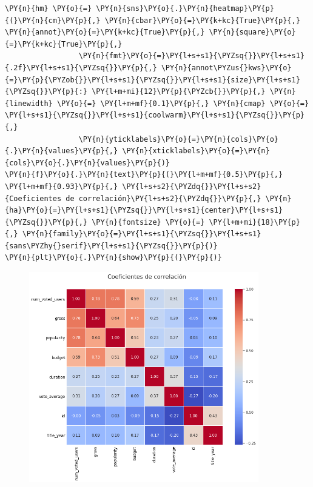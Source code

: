 \begin{tcolorbox}[breakable, size=fbox, boxrule=1pt, pad at break*=1mm,colback=cellbackground, colframe=cellborder]
\begin{Verbatim}[commandchars=\\\{\}]
\PY{n}{hm} \PY{o}{=} \PY{n}{sns}\PY{o}{.}\PY{n}{heatmap}\PY{p}{(}\PY{n}{cm}\PY{p}{,} \PY{n}{cbar}\PY{o}{=}\PY{k+kc}{True}\PY{p}{,} \PY{n}{annot}\PY{o}{=}\PY{k+kc}{True}\PY{p}{,} \PY{n}{square}\PY{o}{=}\PY{k+kc}{True}\PY{p}{,}
                 \PY{n}{fmt}\PY{o}{=}\PY{l+s+s1}{\PYZsq{}}\PY{l+s+s1}{.2f}\PY{l+s+s1}{\PYZsq{}}\PY{p}{,} \PY{n}{annot\PYZus{}kws}\PY{o}{=}\PY{p}{\PYZob{}}\PY{l+s+s1}{\PYZsq{}}\PY{l+s+s1}{size}\PY{l+s+s1}{\PYZsq{}}\PY{p}{:} \PY{l+m+mi}{12}\PY{p}{\PYZcb{}}\PY{p}{,} \PY{n}{linewidth} \PY{o}{=} \PY{l+m+mf}{0.1}\PY{p}{,} \PY{n}{cmap} \PY{o}{=} \PY{l+s+s1}{\PYZsq{}}\PY{l+s+s1}{coolwarm}\PY{l+s+s1}{\PYZsq{}}\PY{p}{,}
                 \PY{n}{yticklabels}\PY{o}{=}\PY{n}{cols}\PY{o}{.}\PY{n}{values}\PY{p}{,} \PY{n}{xticklabels}\PY{o}{=}\PY{n}{cols}\PY{o}{.}\PY{n}{values}\PY{p}{)}
\PY{n}{f}\PY{o}{.}\PY{n}{text}\PY{p}{(}\PY{l+m+mf}{0.5}\PY{p}{,} \PY{l+m+mf}{0.93}\PY{p}{,} \PY{l+s+s2}{\PYZdq{}}\PY{l+s+s2}{Coeficientes de correlación}\PY{l+s+s2}{\PYZdq{}}\PY{p}{,} \PY{n}{ha}\PY{o}{=}\PY{l+s+s1}{\PYZsq{}}\PY{l+s+s1}{center}\PY{l+s+s1}{\PYZsq{}}\PY{p}{,} \PY{n}{fontsize} \PY{o}{=} \PY{l+m+mi}{18}\PY{p}{,} \PY{n}{family}\PY{o}{=}\PY{l+s+s1}{\PYZsq{}}\PY{l+s+s1}{sans\PYZhy{}serif}\PY{l+s+s1}{\PYZsq{}}\PY{p}{)}
\PY{n}{plt}\PY{o}{.}\PY{n}{show}\PY{p}{(}\PY{p}{)}
\end{Verbatim}
\end{tcolorbox}

\begin{figure}[h]
    \centering
    \captionsetup{width=10cm}
    \includegraphics[width=10cm]{./contenido/imagenes/output_64_0.png}

\end{figure}
    { \hspace*{\fill} \\}
    
